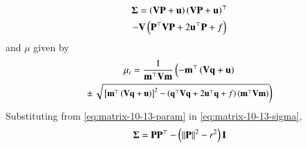\documentclass[journal,12pt,twocolumn]{IEEEtran}
\renewcommand\thesection{\arabic{section}}
\begin{document}
\begin{enumerate}[label=\thesection.\arabic*.,ref=\thesection.\theenumi]
\begin{align}
  \end{align}                    
\begin{multline}
		\bm{\Sigma} = 
	   \left(\mathbf{V}\mathbf{P}+\mathbf{u}\right)
	  \left(\mathbf{V}\mathbf{P}+\mathbf{u}\right)^{\top}
	  \\
   -\mathbf{V}
  \left(
  \mathbf{P}^{\top}\mathbf{V}\mathbf{P} + 2\mathbf{u}^{\top}\mathbf{P} +f
  \right)
	\label{eq:matrix-10-13-sigma}
\end{multline}
  and $\mu$ given by 
\begin{multline}
\mu_i = \frac{1}
{
\mathbf{m}^{\top}\mathbf{V}\mathbf{m}
}
\left(-\mathbf{m}^{\top}\left(\mathbf{V}\mathbf{q}+\mathbf{u}\right)\right.
\\
\pm
{\small
\ensuremath{\left.\sqrt{
{}\left[
\mathbf{m}^{\top}\left(\mathbf{V}\mathbf{q}+\mathbf{u}\right)
\right]^2
-
\left(
\mathbf{q}^{\top}\mathbf{V}\mathbf{q} + 2\mathbf{u}^{\top}\mathbf{q} +f
\right)
\left(\mathbf{m}^{\top}\mathbf{V}\mathbf{m}\right)
}
\right)}
}
\label{eq:tangent_roots}
\end{multline}
Substituting from 
	\eqref{eq:matrix-10-13-param} in 
	\eqref{eq:matrix-10-13-sigma},
\begin{align}
		\bm{\Sigma} = 
	   \mathbf{P}
	  \mathbf{P}^{\top}
   -
  \left(
	  \left\lVert\mathbf{P}\right\rVert^{2}  -r^{2}\right)\mathbf{I}
	\label{eq:matrix-10-13-sigma}
\end{align}



\end{enumerate}
\end{document}
